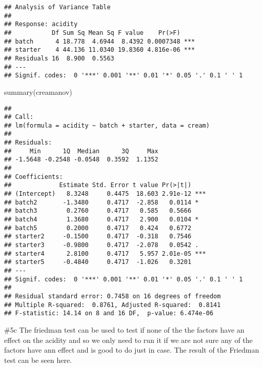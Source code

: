 \documentclass[
]{article}
\newenvironment{Shaded}{\begin{snugshade}}{\end{snugshade}}
\newcommand{\AttributeTok}[1]{\textcolor[rgb]{0.77,0.63,0.00}{#1}}
\newcommand{\FunctionTok}[1]{\textcolor[rgb]{0.00,0.00,0.00}{#1}}
\newcommand{\NormalTok}[1]{#1}
\newcommand{\SpecialCharTok}[1]{\textcolor[rgb]{0.00,0.00,0.00}{#1}}
\begin{document}
\begin{verbatim}
## Analysis of Variance Table
## 
## Response: acidity
##           Df Sum Sq Mean Sq F value    Pr(>F)    
## batch      4 18.778  4.6944  8.4392 0.0007348 ***
## starter    4 44.136 11.0340 19.8360 4.816e-06 ***
## Residuals 16  8.900  0.5563                      
## ---
## Signif. codes:  0 '***' 0.001 '**' 0.01 '*' 0.05 '.' 0.1 ' ' 1
\end{verbatim}

\begin{Shaded}
\begin{Highlighting}[]
\FunctionTok{summary}\NormalTok{(creamanov)}
\end{Highlighting}
\end{Shaded}

\begin{verbatim}
## 
## Call:
## lm(formula = acidity ~ batch + starter, data = cream)
## 
## Residuals:
##     Min      1Q  Median      3Q     Max 
## -1.5648 -0.2548 -0.0548  0.3592  1.1352 
## 
## Coefficients:
##             Estimate Std. Error t value Pr(>|t|)    
## (Intercept)   8.3248     0.4475  18.603 2.91e-12 ***
## batch2       -1.3480     0.4717  -2.858   0.0114 *  
## batch3        0.2760     0.4717   0.585   0.5666    
## batch4        1.3680     0.4717   2.900   0.0104 *  
## batch5        0.2000     0.4717   0.424   0.6772    
## starter2     -0.1500     0.4717  -0.318   0.7546    
## starter3     -0.9800     0.4717  -2.078   0.0542 .  
## starter4      2.8100     0.4717   5.957 2.01e-05 ***
## starter5     -0.4840     0.4717  -1.026   0.3201    
## ---
## Signif. codes:  0 '***' 0.001 '**' 0.01 '*' 0.05 '.' 0.1 ' ' 1
## 
## Residual standard error: 0.7458 on 16 degrees of freedom
## Multiple R-squared:  0.8761, Adjusted R-squared:  0.8141 
## F-statistic: 14.14 on 8 and 16 DF,  p-value: 6.474e-06
\end{verbatim}

\#5c The friedman test can be used to test if none of the the factors
have an effect on the acidity and so we only need to run it if we are
not sure any of the factors have ann effect and is good to do just in
case. The result of the Friedman test can be seen here.

\begin{Shaded}
\end{Shaded}
\end{document}
